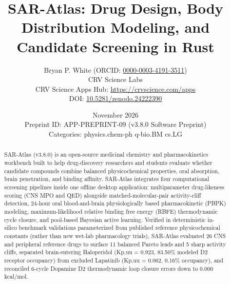 \documentclass[10pt,letterpaper]{article}
\title{\textbf{SAR-Atlas: Drug Design, Body Distribution Modeling, and Candidate Screening in Rust}}
\author{Bryan P. White (ORCID: \href{https://orcid.org/0000-0003-4191-3511}{0000-0003-4191-3511}) \\ CRV Science Labs \\ \small CRV Science Apps Hub: \url{https://crvscience.com/apps} \\ \small DOI: \href{https://doi.org/10.5281/zenodo.24222390}{10.5281/zenodo.24222390}}
\date{November 2026 \\ \small Preprint ID: APP-PREPRINT-09 (v3.8.0 Software Preprint) \\ \small Categories: physics.chem-ph \textbullet{} q-bio.BM \textbullet{} cs.LG}
\begin{document}
\maketitle

\begin{abstract}
SAR-Atlas (v3.8.0) is an open-source medicinal chemistry and pharmacokinetics workbench built to help drug-discovery researchers and students evaluate whether candidate compounds combine balanced physicochemical properties, oral absorption, brain penetration, and binding affinity. SAR-Atlas integrates four computational screening pipelines inside one offline desktop application: multiparameter drug-likeness scoring (CNS MPO and QED) alongside matched-molecular-pair activity-cliff detection, 24-hour oral blood-and-brain physiologically based pharmacokinetic (PBPK) modeling, maximum-likelihood relative binding free energy (RBFE) thermodynamic cycle closure, and pool-based Bayesian active learning. Verified in deterministic in-silico benchmark validations parameterized from published reference physicochemical constants (rather than new wet-lab pharmacology trials), SAR-Atlas evaluated 26 CNS and peripheral reference drugs to surface 11 balanced Pareto leads and 5 sharp activity cliffs, separated brain-entering Haloperidol (Kp,uu = 0.923, 83.50\% modeled D2 receptor occupancy) from excluded Lapatinib (Kp,uu = 0.062, 0.16\% occupancy), and reconciled 6-cycle Dopamine D2 thermodynamic loop closure errors down to 0.000 kcal/mol.
\end{abstract}
\end{document}
